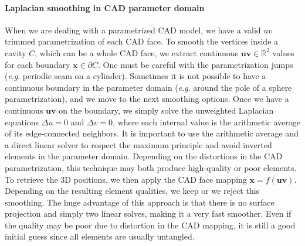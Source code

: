 \documentclass[AMA,STIX1COL]{WileyNJD-v2}
\newcommand{\vx}{\ensuremath{\mathbf{x}}}
\newcommand{\vuv}{\ensuremath{\mathbf{uv}}}
\newcommand{\reals}{\ensuremath{\mathbb{R}}}
\newcommand{\eg}{\textit{e}.\textit{g}. }
\begin{document}
{\paragraph{Laplacian smoothing in CAD parameter domain} When we are dealing with
a parametrized CAD model, we have a valid $uv$ trimmed parametrization of each
CAD face.  To smooth the vertices inside a cavity $C$, which can be a whole CAD
face, we extract continuous $\vuv \in \reals^2$ values for each boundary $\vx \in \partial C$.
One must be careful with the parametrization jumps (\eg periodic seam on a
cylinder). Sometimes it is not possible to have a continuous boundary in the
parameter domain (\eg around the pole of a sphere parametrization), and we move
to the next smoothing options. Once we have a continuous $\vuv$ on the boundary,
we simply solve the unweighted Laplacian equations $\Delta u = 0$ and 
$\Delta v = 0$, 
where each internal value is the arithmetic average of its edge-connected
neighbors. It is important to use the arithmetic average and a direct linear
solver to respect the maximum principle and avoid inverted elements in the
parameter domain. Depending on the distortions in the CAD parametrization,
this technique may both produce high-quality or poor elements.
To retrieve the 3D positions, we then apply the CAD face mapping
$\vx = f(\vuv)$. Depending on the resulting element qualities, we keep or we reject
this smoothing. 
The huge advantage of this approach is that there is no surface
projection and simply two linear solves, making it a very fast smoother.
Even if the quality may be poor due to distortion in the CAD mapping, it is 
still a good initial guess since all elements are usually untangled.

}
\end{document}
